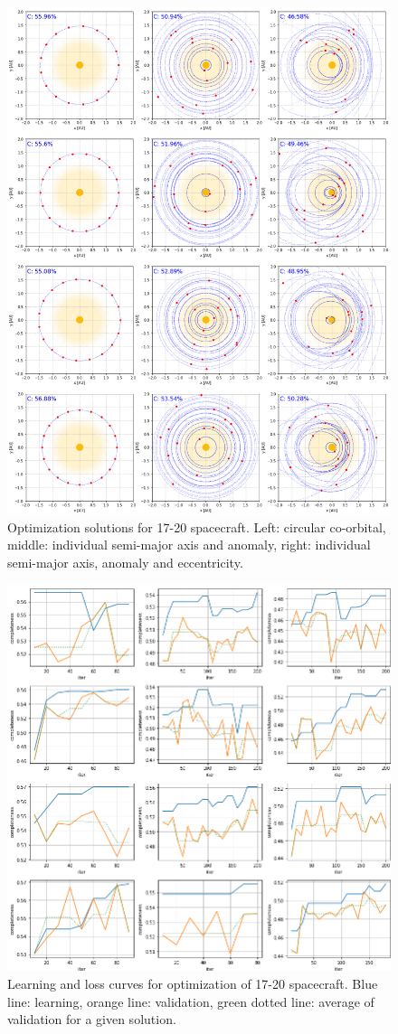 \begin{figure}[p]
 \centering
 \includegraphics[width=1.0\textwidth]{img/appendix_orbit_5.png}
 \caption{Optimization solutions for 17-20 spacecraft. Left: circular co-orbital, middle: individual semi-major axis and anomaly, right: individual semi-major axis, anomaly and eccentricity.}
\end{figure}

\begin{figure}[p]
 \centering
 \includegraphics[width=1.0\textwidth]{img/appendix_loss_5.png}
 \caption{Learning and loss curves for optimization of 17-20 spacecraft. Blue line: learning, orange line: validation, green dotted line: average of validation for a given solution.}
\end{figure}
